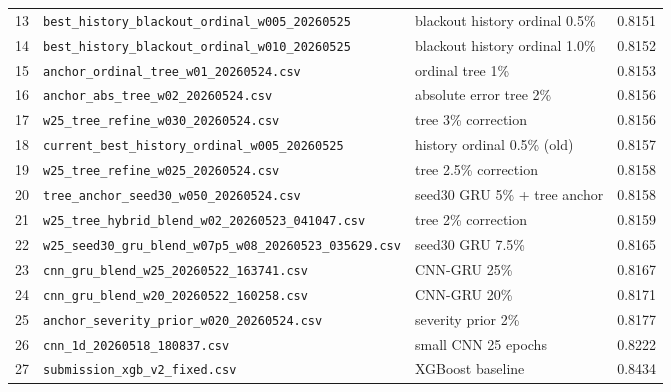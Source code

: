 \documentclass[12pt, a4paper]{article}
\begin{document}
\begin{table}[H]
\begin{tabular}{@{}rllc@{}}
13 & \texttt{best\_history\_blackout\_ordinal\_w005\_20260525}   & blackout history ordinal 0.5\%              & 0.8151 \\
14 & \texttt{best\_history\_blackout\_ordinal\_w010\_20260525}   & blackout history ordinal 1.0\%              & 0.8152 \\
15 & \texttt{anchor\_ordinal\_tree\_w01\_20260524.csv}          & ordinal tree 1\%                            & 0.8153 \\
16 & \texttt{anchor\_abs\_tree\_w02\_20260524.csv}              & absolute error tree 2\%                     & 0.8156 \\
17 & \texttt{w25\_tree\_refine\_w030\_20260524.csv}              & tree 3\% correction                         & 0.8156 \\
18 & \texttt{current\_best\_history\_ordinal\_w005\_20260525}    & history ordinal 0.5\% (old)                 & 0.8157 \\
19 & \texttt{w25\_tree\_refine\_w025\_20260524.csv}              & tree 2.5\% correction                       & 0.8158 \\
20 & \texttt{tree\_anchor\_seed30\_w050\_20260524.csv}           & seed30 GRU 5\% + tree anchor                & 0.8158 \\
21 & \texttt{w25\_tree\_hybrid\_blend\_w02\_20260523\_041047.csv}& tree 2\% correction                         & 0.8159 \\
22 & \texttt{w25\_seed30\_gru\_blend\_w07p5\_w08\_20260523\_035629.csv} & seed30 GRU 7.5\%                    & 0.8165 \\
23 & \texttt{cnn\_gru\_blend\_w25\_20260522\_163741.csv}         & CNN-GRU 25\%                                & 0.8167 \\
24 & \texttt{cnn\_gru\_blend\_w20\_20260522\_160258.csv}         & CNN-GRU 20\%                                & 0.8171 \\
25 & \texttt{anchor\_severity\_prior\_w020\_20260524.csv}        & severity prior 2\%                          & 0.8177 \\
26 & \texttt{cnn\_1d\_20260518\_180837.csv}                      & small CNN 25 epochs                         & 0.8222 \\
27 & \texttt{submission\_xgb\_v2\_fixed.csv}                     & XGBoost baseline                            & 0.8434 \\
\bottomrule
\end{tabular}
\end{table}
\end{document}
